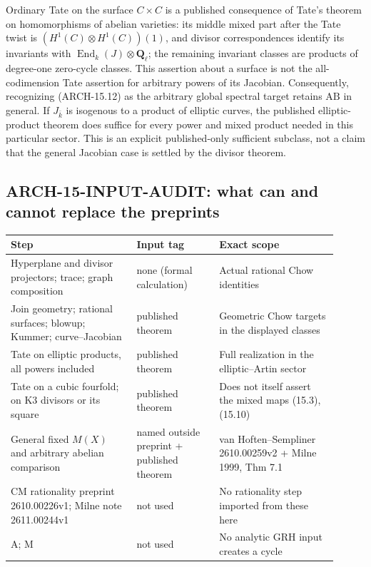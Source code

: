Ordinary Tate on the surface \(C\times C\) is a published consequence
of Tate's theorem on homomorphisms of abelian varieties: its middle
mixed part after the Tate twist is \((H^1(C)\otimes H^1(C))(1)\), and divisor correspondences
identify its invariants with \(\operatorname{End}_{k}(J)\otimes
\mathbf Q_\ell\); the remaining invariant classes are products of
degree-one zero-cycle classes. This assertion about a surface is not
the all-codimension Tate assertion for arbitrary powers of its
Jacobian. Consequently, recognizing (ARCH-15.12) as the arbitrary
global spectral target retains \(\mathrm{AB}\) in general. If
\(J_{\bar k}\) is isogenous to a product of elliptic curves, the
published elliptic-product theorem does suffice for every power and
mixed product needed in this particular sector. This is an explicit
published-only sufficient subclass, not a claim that the general
Jacobian case is settled by the divisor theorem.

\subsection{ARCH-15-INPUT-AUDIT: what can and cannot replace the preprints}

\begin{center}
\begin{tabular}{p{0.35\linewidth}p{0.23\linewidth}p{0.33\linewidth}}
Step & Input tag & Exact scope\\\hline
Hyperplane and divisor projectors; trace; graph composition
 & none (formal calculation) & Actual rational Chow identities\\
Join geometry; rational surfaces; blowup; Kummer; curve--Jacobian
 & published theorem & Geometric Chow targets in the displayed classes\\
Tate on elliptic products, all powers included
 & published theorem & Full realization in the elliptic--Artin sector\\
Tate on a cubic fourfold; on K3 divisors or its square
 & published theorem & Does not itself assert the mixed maps (15.3), (15.10)\\
General fixed \(M(X)\) and arbitrary abelian comparison
 & named outside preprint + published theorem & van Hoften--Sempliner 2610.00259v2 + Milne 1999, Thm 7.1\\
CM rationality preprint 2610.00226v1; Milne note 2611.00244v1
 & not used & No rationality step imported from these here\\
A; M & not used & No analytic GRH input creates a cycle\\
\end{tabular}
\end{center}

